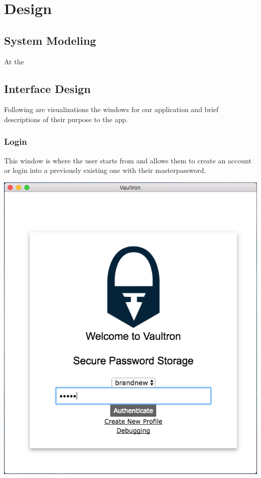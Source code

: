 \documentclass[11pt]{report}
\begin{document}
    \nocite{*}
    \printbibliography[heading=none]




\chapter{Design}

\section{System Modeling}
At the 



\section{Interface Design}
Following are visualizations the windows for our application and brief 
descriptions of their purpose to the app.

\subsection{Login}
This window is where the user starts from and allows them to create an account
or login into a previously existing one with their masterpassword.

\begin{center}
\includegraphics[scale=0.50]{app-login-demo.png}
\end{center}
\end{document}
